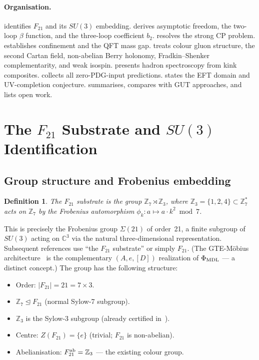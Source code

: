 \documentclass[11pt]{article}
\newtheorem{definition}[theorem]{Definition}
\theoremstyle{remark}
\newcommand{\ZS}{\mathbb{Z}_7}
\newcommand{\ZZ}{\mathbb{Z}}
\newcommand{\phimdl}{\Phi_{\rm MDL}}
\newcommand{\Ftwentyone}{F_{21}}
\begin{document}
\paragraph{Organisation.}
 identifies $\Ftwentyone$ and its $SU(3)$ embedding.
 derives asymptotic freedom, the two-loop $\beta$ function,
and the three-loop coefficient $b_2$.
 resolves the strong CP problem.
 establishes confinement and the QFT mass gap.
 treats colour gluon structure, the second Cartan field,
non-abelian Berry holonomy, Fradkin--Shenker complementarity, and weak isospin.
 presents hadron spectroscopy from kink composites.
 collects all zero-PDG-input predictions.
 states the EFT domain and UV-completion conjecture.
 summarises, compares with GUT approaches, and lists
open work.

\section{The \texorpdfstring{$F_{21}$}{F21} Substrate and \texorpdfstring{$SU(3)$}{SU(3)} Identification}
\label{sec:f21}

\subsection{Group structure and Frobenius embedding}
\label{ssec:f21group}

\begin{definition}
The \textit{$\Ftwentyone$ substrate} is the group
$\ZS \rtimes \ZZ_3$, where $\ZZ_3 = \{1,2,4\} \subset \ZS^*$ acts on $\ZS$
by the Frobenius automorphism $\phi_k : a \mapsto a \cdot k^2 \bmod 7$.
\end{definition}

This is precisely the Frobenius group $\Sigma(21)$ of order~21, a finite subgroup of
$SU(3)$ acting on $\mathbb{C}^3$ via the natural three-dimensional representation.
Subsequent references use ``the $\Ftwentyone$ substrate'' or simply $\Ftwentyone$.
(The GTE-M\"{o}bius architecture~\cite{SpivackGTEMobius} is the complementary
$(A, e, [D])$ realization of $\phimdl$ — a distinct concept.)
The group has the following structure:
\begin{itemize}[leftmargin=2em]
\item Order: $|\Ftwentyone| = 21 = 7 \times 3$.
\item $\ZS \trianglelefteq \Ftwentyone$ (normal Sylow-7 subgroup).
\item $\ZZ_3$ is the Sylow-3 subgroup (already certified in~\cite{SpivackCompUniversality}).
\item Centre: $Z(\Ftwentyone) = \{e\}$ (trivial; $\Ftwentyone$ is non-abelian).
\item Abelianisation: $\Ftwentyone^{\rm ab} = \ZZ_3$ --- the existing colour group.
\end{itemize}
\end{document}
